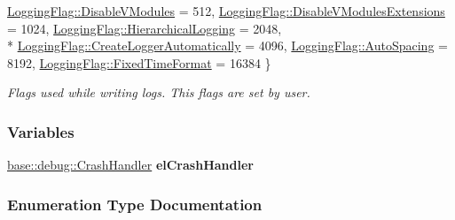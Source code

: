 \begin{DoxyCompactItemize}
\hyperlink{a00183_a2784aacd04cb7816ac1c0b20fcbf83cba22cae5066e8e0623cb90e20a18abb631}{Logging\+Flag\+::\+Disable\+V\+Modules} = 512, 
\hyperlink{a00183_a2784aacd04cb7816ac1c0b20fcbf83cba18a8e65b84ca0cc82451b5e155d7aeb4}{Logging\+Flag\+::\+Disable\+V\+Modules\+Extensions} = 1024, 
\hyperlink{a00183_a2784aacd04cb7816ac1c0b20fcbf83cba477de0500d7a5b64a4500d82811fc058}{Logging\+Flag\+::\+Hierarchical\+Logging} = 2048, 
\\*
\hyperlink{a00183_a2784aacd04cb7816ac1c0b20fcbf83cba2afa5afe77105aadedcbb90dd8547cc3}{Logging\+Flag\+::\+Create\+Logger\+Automatically} = 4096, 
\hyperlink{a00183_a2784aacd04cb7816ac1c0b20fcbf83cba34620f140246d3c3b68c17fdf7b8ada7}{Logging\+Flag\+::\+Auto\+Spacing} = 8192, 
\hyperlink{a00183_a2784aacd04cb7816ac1c0b20fcbf83cbaebbb601e28e0cf821dfe13b4a7cf409e}{Logging\+Flag\+::\+Fixed\+Time\+Format} = 16384
 \}
\begin{DoxyCompactList}\small\item\em Flags used while writing logs. This flags are set by user. \end{DoxyCompactList}\end{DoxyCompactItemize}
\subsubsection*{Variables}
\begin{DoxyCompactItemize}
\item 
\hypertarget{a00183_ab9770514f33aef6683dbba37be2b471d}{}\hyperlink{a00016}{base\+::debug\+::\+Crash\+Handler} {\bfseries el\+Crash\+Handler}\label{a00183_ab9770514f33aef6683dbba37be2b471d}

\end{DoxyCompactItemize}


\subsubsection{Enumeration Type Documentation}
\hypertarget{a00183_a281f5db6d6163678bc68a8b23b59e124}{}
